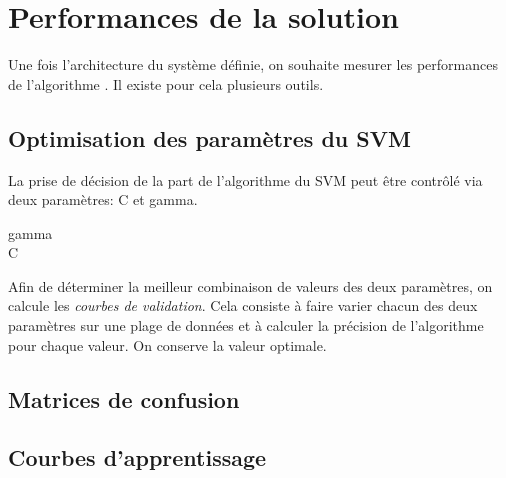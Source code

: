 \section{Performances de la solution}
\label{Automatisation du processus d'investigation: Performances de la solution}
Une fois l'architecture du système définie, on souhaite mesurer les performances de l'algorithme . Il existe pour cela plusieurs outils.

\subsection{Optimisation des paramètres du SVM}
\label{Industrialisation du produit: Performances de la solution:Optimisation des paramètres du SVM}
La prise de décision de la part de l'algorithme du SVM peut être contrôlé via deux paramètres: C et gamma.
\begin{description}
	\item [gamma] 
	\item [C]
\end{description}

Afin de déterminer la meilleur combinaison de valeurs des deux paramètres, on calcule les \emph{courbes de validation}. Cela consiste à faire varier chacun des deux paramètres sur une plage de données et à calculer la précision de l'algorithme pour chaque valeur. On conserve la valeur optimale. 

\subsection{Matrices de confusion}
\label{Industrialisation du produit: Performances de la solution:Matrices de confusion}

\subsection{Courbes d'apprentissage}
\label{Industrialisation du produit: Performances de la solution:Courbes d'apprentissage}